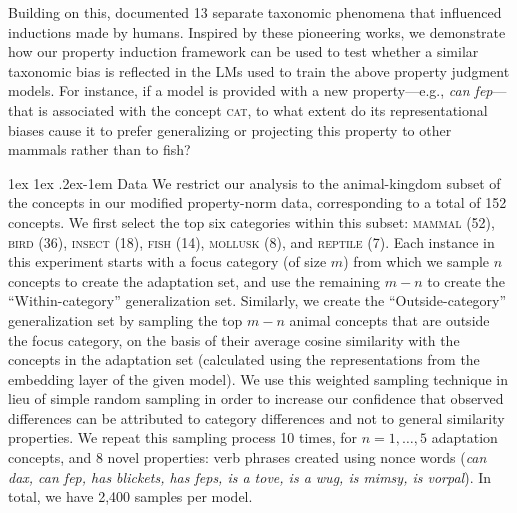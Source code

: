 \documentclass[10pt,letterpaper]{article}
\makeatletter
\renewcommand{\paragraph}{%
  \@startsection{paragraph}{4}%
  {\z@}{1ex \@plus 1ex \@minus .2ex}{-1em}%
  {\normalfont\normalsize\bfseries}%
}
\makeatother
\begin{document}
Building on this, \citet{osherson1990category} documented 13 separate taxonomic phenomena that influenced inductions made by humans.
Inspired by these pioneering works, we demonstrate how our property induction framework can be used to test whether a similar taxonomic bias is reflected in the LMs used to train the above property judgment models. 
For instance, if a model is provided with a new property---e.g., \textit{can fep}---that is associated with the concept \textsc{cat}, to what extent do its representational biases cause it to prefer generalizing or projecting this property to other mammals rather than to fish? 


\paragraph{Data} We restrict our analysis to the animal-kingdom subset of the concepts in our modified property-norm data, corresponding to a total of 152 concepts.
We first select the top six categories within this subset: \textsc{mammal} (52), \textsc{bird} (36), \textsc{insect} (18), \textsc{fish} (14), \textsc{mollusk} (8), and \textsc{reptile} (7).
Each instance in this experiment starts with a focus category (of size $m$) from which we sample $n$ concepts to create the adaptation set, and use the remaining $m-n$ to create the ``Within-category'' generalization set.
Similarly, we create the ``Outside-category'' generalization set by sampling the top $m-n$ animal concepts that are outside the focus category, on the basis of their average cosine similarity with the concepts in the adaptation set (calculated using the representations from the embedding layer of the given model). We use this weighted sampling technique in lieu of simple random sampling in order to increase our confidence that observed differences can be attributed to category differences and not to general similarity properties.
We repeat this sampling process 10 times, for $n = 1, \dots, 5$ adaptation concepts, and 8 novel properties: verb phrases created using nonce words (\textit{can dax, can fep, has blickets, has feps, is a tove, is a wug, is mimsy, is vorpal}). In total, we have 2{,}400 samples per model.
\end{document}
